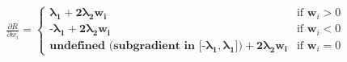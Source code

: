 \documentclass[preview]{standalone}
\begin{document}
\begin{align*}
\frac{\partial R}{\partial w_i} =\begin{cases}\boldsymbol{\lambda}_\textbf{1} + \textbf{2}\boldsymbol{\lambda}_\textbf{2} \mathbf{w_i} & \text{if } \mathbf{w}_i > 0 \\\textbf{-}\boldsymbol{\lambda}_\textbf{1} + \textbf{2}\boldsymbol{\lambda}_\textbf{2} \mathbf{w_i} & \text{if } \mathbf{w}_i < 0 \\\textbf{undefined (subgradient in } \textbf{[}\textbf{-}\boldsymbol{\lambda}_\textbf{1}, \boldsymbol{\lambda}_\textbf{1}\textbf{]}\textbf{)} + \textbf{2}\boldsymbol{\lambda}_\textbf{2}\mathbf{w}_\textbf{i} & \text{if } \mathbf{w}_i = 0\end{cases}
\end{align*}
\end{document}
